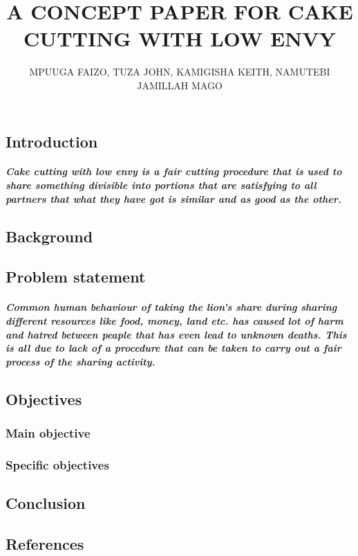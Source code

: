 \documentclass[12pt]{report}
\title{\textbf{A CONCEPT PAPER FOR CAKE CUTTING WITH LOW ENVY}}
\author{	MPUUGA FAIZO, TUZA JOHN, KAMIGISHA KEITH, NAMUTEBI JAMILLAH MAGO}
\begin{document}
\maketitle
\chapter{}
\section{Introduction} 
\paragraph{Cake cutting with low envy is a fair cutting procedure that is used to share something divisible into portions that are satisfying to all partners that what they have got is similar and as good as the other. }


\section{Background}
\section{Problem statement}
\paragraph{Common human behaviour of taking the lion's share during sharing different resources like food, money, land etc. has caused lot of harm and hatred between peaple that has even lead to unknown deaths. This is all due to lack of a procedure that can be taken to carry out a fair process of the sharing activity. }
\section{Objectives}
\subsection{Main objective}
\subsection{Specific objectives}
\section{Conclusion}
\section{References}
\end{document}
